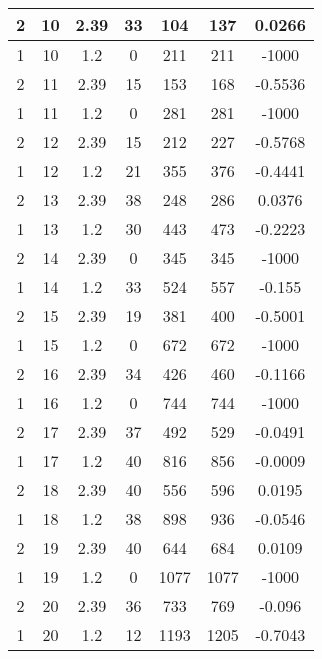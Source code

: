 \documentclass[letterpaper, 12pt]{article}
\begin{document}
\begin{longtable}{|c|c|c|c|c|c|c|}
\hline
2 & 10 & 2.39 & 33 & 104 & 137 & 0.0266 \\
\hline
1 & 10 & 1.2 & 0 & 211 & 211 & -1000 \\
\hline
2 & 11 & 2.39 & 15 & 153 & 168 & -0.5536 \\
\hline
1 & 11 & 1.2 & 0 & 281 & 281 & -1000 \\
\hline
2 & 12 & 2.39 & 15 & 212 & 227 & -0.5768 \\
\hline
1 & 12 & 1.2 & 21 & 355 & 376 & -0.4441 \\
\hline
2 & 13 & 2.39 & 38 & 248 & 286 & 0.0376 \\
\hline
1 & 13 & 1.2 & 30 & 443 & 473 & -0.2223 \\
\hline
2 & 14 & 2.39 & 0 & 345 & 345 & -1000 \\
\hline
1 & 14 & 1.2 & 33 & 524 & 557 & -0.155 \\
\hline
2 & 15 & 2.39 & 19 & 381 & 400 & -0.5001 \\
\hline
1 & 15 & 1.2 & 0 & 672 & 672 & -1000 \\
\hline
2 & 16 & 2.39 & 34 & 426 & 460 & -0.1166 \\
\hline
1 & 16 & 1.2 & 0 & 744 & 744 & -1000 \\
\hline
2 & 17 & 2.39 & 37 & 492 & 529 & -0.0491 \\
\hline
1 & 17 & 1.2 & 40 & 816 & 856 & -0.0009 \\
\hline
2 & 18 & 2.39 & 40 & 556 & 596 & 0.0195 \\
\hline
1 & 18 & 1.2 & 38 & 898 & 936 & -0.0546 \\
\hline
2 & 19 & 2.39 & 40 & 644 & 684 & 0.0109 \\
\hline
1 & 19 & 1.2 & 0 & 1077 & 1077 & -1000 \\
\hline
2 & 20 & 2.39 & 36 & 733 & 769 & -0.096 \\
\hline
1 & 20 & 1.2 & 12 & 1193 & 1205 & -0.7043 \\
\hline
\end{longtable}
\end{document}
